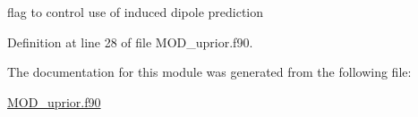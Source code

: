 flag to control use of induced dipole prediction 



Definition at line 28 of file M\-O\-D\-\_\-uprior.\-f90.



The documentation for this module was generated from the following file\-:\begin{DoxyCompactItemize}
\item 
\hyperlink{MOD__uprior_8f90}{M\-O\-D\-\_\-uprior.\-f90}\end{DoxyCompactItemize}
